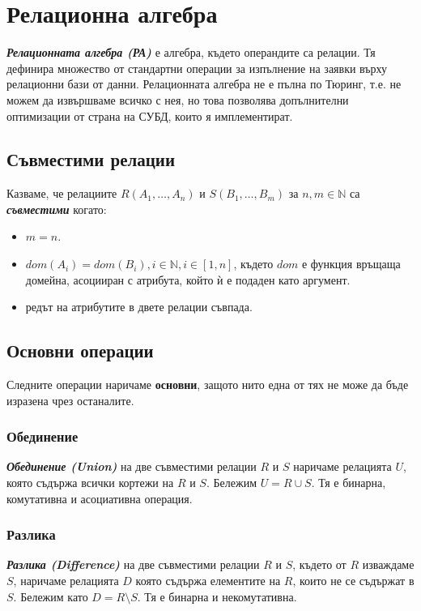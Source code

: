 \documentclass[fleqn,12pt]{article}
\begin{document}
\section{Релационна алгебра}

\textit{\textbf{Релационната алгебра (РА)}} е алгебра, където операндите са релации.
Тя дефинира множество от стандартни операции за изпълнение на заявки върху релационни бази от данни.
Релационната алгебра не е пълна по Тюринг, т.е. не можем да извършваме всичко с нея, но това позволява допълнителни оптимизации от страна на СУБД, които я имплементират.

\subsection{Съвместими релации}
Казваме, че релациите $R(A_1, \dots, A_n)$ и $S(B_1, \dots, B_m)$ за $n, m \in \mathbb{N}$ са \textbf{\textit{съвместими}} когато:
\begin{itemize}
    \item $m = n$.
    \item $dom(A_i) = dom(B_i), i \in \mathbb{N}, i \in [1, n]$, където $dom$ е функция връщаща домейна, асоцииран с атрибута, който ѝ е подаден като аргумент.
    \item редът на атрибутите в двете релации съвпада.
\end{itemize}

\subsection{Основни операции}
Следните операции наричаме \textbf{основни}, защото нито една от тях не може да бъде изразена чрез останалите.

\subsubsection{Обединение}
\textbf{\textit{Обединение (Union)}} на две съвместими релации $R$ и $S$ наричаме релацията $U$, която съдържа всички кортежи на $R$ и $S$.
Бележим $U = R \cup S$.
Тя е бинарна, комутативна и асоциативна операция.

\subsubsection{Разлика}
\textbf{\textit{Разлика (Difference)}} на две съвместими релации $R$ и $S$, където от $R$ изваждаме $S$, наричаме релацията $D$ която съдържа елементите на $R$, които не се съдържат в $S$.
Бележим като $D = R \setminus S$.
Тя е бинарна и некомутативна.
\end{document}
